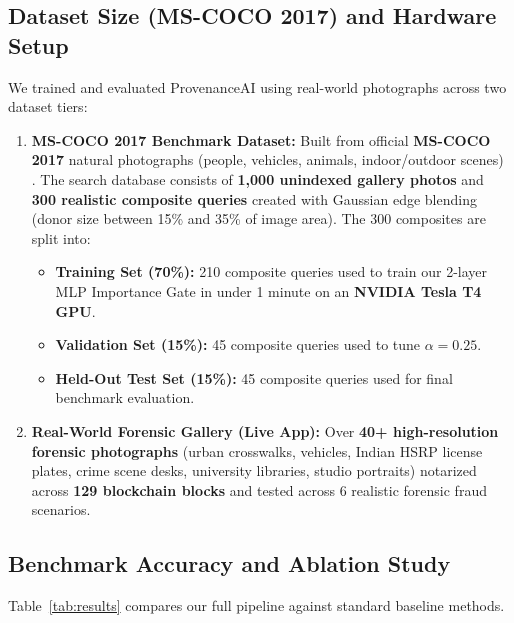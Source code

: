 \documentclass[12pt,a4paper]{article}
\begin{document}
\subsection{Dataset Size (MS-COCO 2017) and Hardware Setup}
We trained and evaluated ProvenanceAI using real-world photographs across two dataset tiers:
\begin{enumerate}
    \item \textbf{MS-COCO 2017 Benchmark Dataset:} Built from official \textbf{MS-COCO 2017} natural photographs (people, vehicles, animals, indoor/outdoor scenes) \cite{coco}. The search database consists of \textbf{1,000 unindexed gallery photos} and \textbf{300 realistic composite queries} created with Gaussian edge blending (donor size between 15\% and 35\% of image area). The 300 composites are split into:
    \begin{itemize}
        \item \textbf{Training Set (70\%):} 210 composite queries used to train our 2-layer MLP Importance Gate in under 1 minute on an \textbf{NVIDIA Tesla T4 GPU}.
        \item \textbf{Validation Set (15\%):} 45 composite queries used to tune $\alpha = 0.25$.
        \item \textbf{Held-Out Test Set (15\%):} 45 composite queries used for final benchmark evaluation.
    \end{itemize}
    \item \textbf{Real-World Forensic Gallery (Live App):} Over \textbf{40+ high-resolution forensic photographs} (urban crosswalks, vehicles, Indian HSRP license plates, crime scene desks, university libraries, studio portraits) notarized across \textbf{129 blockchain blocks} and tested across 6 realistic forensic fraud scenarios.
\end{enumerate}

\subsection{Benchmark Accuracy and Ablation Study}
Table~\ref{tab:results} compares our full pipeline against standard baseline methods.
\end{document}
